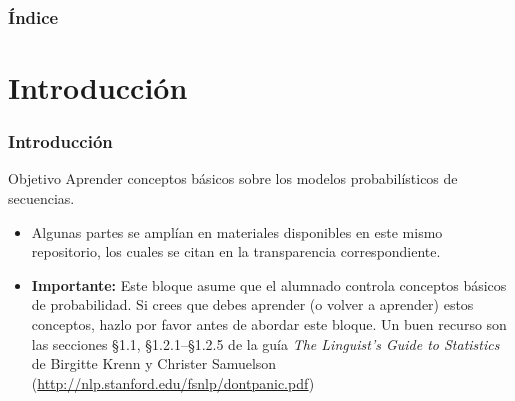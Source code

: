 



\begin{frame}
  \titlepage
\end{frame}

\begin{frame}
  \frametitle{Índice}
  \tableofcontents 
\end{frame}

  
\section{Introducción}
\begin{frame} 
\frametitle{Introducción}

\begin{block}{Objetivo}
  Aprender conceptos básicos sobre los modelos probabilísticos de secuencias.
\end{block}

\begin{itemize}
\item Algunas partes se amplían en materiales disponibles en este mismo repositorio, los cuales se citan en la transparencia correspondiente.
\item \textbf{Importante:} Este bloque asume que el alumnado controla conceptos básicos de probabilidad. Si crees que debes aprender (o volver a aprender) estos conceptos, hazlo por favor antes de abordar este bloque. Un buen recurso son las secciones §1.1, §1.2.1–§1.2.5 de la guía \emph{The Linguist's Guide to Statistics} de Birgitte Krenn y Christer Samuelson (\url{http://nlp.stanford.edu/fsnlp/dontpanic.pdf})

\end{itemize}
\end{frame}

